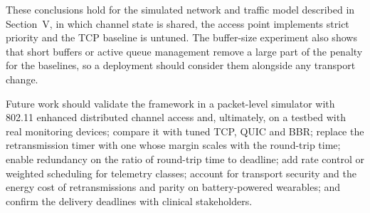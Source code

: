 \documentclass[10pt,twocolumn,letterpaper]{article}
\begin{document}
These conclusions hold for the simulated network and traffic model described in Section~V, in which channel state is shared, the access point implements strict priority and the TCP baseline is untuned. The buffer-size experiment also shows that short buffers or active queue management remove a large part of the penalty for the baselines, so a deployment should consider them alongside any transport change.

Future work should validate the framework in a packet-level simulator with 802.11 enhanced distributed channel access and, ultimately, on a testbed with real monitoring devices; compare it with tuned TCP, QUIC and BBR; replace the retransmission timer with one whose margin scales with the round-trip time; enable redundancy on the ratio of round-trip time to deadline; add rate control or weighted scheduling for telemetry classes; account for transport security and the energy cost of retransmissions and parity on battery-powered wearables; and confirm the delivery deadlines with clinical stakeholders.
\end{document}
